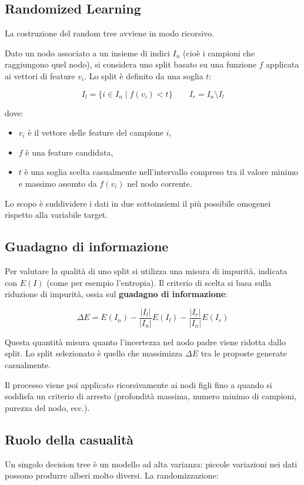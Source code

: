 \subsection{Randomized Learning}

La costruzione del random tree avviene in modo ricorsivo. 

Dato un nodo associato a un insieme di indici $I_n$ (cioè i campioni che raggiungono quel nodo), si considera uno split basato su una funzione $f$ applicata ai vettori di feature $v_i$. Lo split è definito da una soglia $t$:

\[
I_l = \{ i \in I_n \mid f(v_i) < t \}
\qquad
I_r = I_n \setminus I_l
\]

dove:
\begin{itemize}
    \item $v_i$ è il vettore delle feature del campione $i$,
    \item $f$ è una feature candidata,
    \item $t$ è una soglia scelta casualmente nell’intervallo compreso tra il valore minimo e massimo assunto da $f(v_i)$ nel nodo corrente.
\end{itemize}

Lo scopo è suddividere i dati in due sottoinsiemi il più possibile omogenei rispetto alla variabile target.

\subsection{Guadagno di informazione}

Per valutare la qualità di uno split si utilizza una misura di impurità, indicata con $E(I)$ (come per esempio l'entropia). Il criterio di scelta si basa sulla riduzione di impurità, ossia sul \textbf{guadagno di informazione}:

\[
\Delta E
=
E(I_n)
-
\frac{|I_l|}{|I_n|} E(I_l)
-
\frac{|I_r|}{|I_n|} E(I_r)
\]

Questa quantità misura quanto l’incertezza nel nodo padre viene ridotta dallo split. Lo split selezionato è quello che massimizza $\Delta E$ tra le proposte generate casualmente.

Il processo viene poi applicato ricorsivamente ai nodi figli fino a quando si soddisfa un criterio di arresto (profondità massima, numero minimo di campioni, purezza del nodo, ecc.).

\subsection{Ruolo della casualità}
Un singolo decision tree è un modello ad alta varianza: piccole variazioni nei dati possono produrre alberi molto diversi. La randomizzazione:

